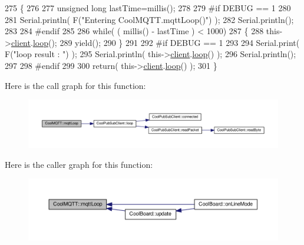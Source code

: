\begin{DoxyCode}
275 \{
276 
277     \textcolor{keywordtype}{unsigned} \textcolor{keywordtype}{long} lastTime=millis();
278 
279 \textcolor{preprocessor}{#if DEBUG == 1}
280 
281     Serial.println( F(\textcolor{stringliteral}{"Entering CoolMQTT.mqttLoop()"}) );
282     Serial.println();
283 
284 \textcolor{preprocessor}{#endif  }
285 
286     \textcolor{keywordflow}{while}( ( millis() - lastTime ) < 1000)
287     \{
288         this->\hyperlink{class_cool_m_q_t_t_afed1372683c44893b4668d0f1771f514}{client}.\hyperlink{class_cool_pub_sub_client_afc15900f0fc4886a19394508e61793b8}{loop}();
289         yield();
290     \}
291 
292 \textcolor{preprocessor}{#if DEBUG == 1 }
293     
294     Serial.print( F(\textcolor{stringliteral}{"loop result : "}) );
295     Serial.println( this->\hyperlink{class_cool_m_q_t_t_afed1372683c44893b4668d0f1771f514}{client}.\hyperlink{class_cool_pub_sub_client_afc15900f0fc4886a19394508e61793b8}{loop}() );
296     Serial.println();
297 
298 \textcolor{preprocessor}{#endif}
299 
300     \textcolor{keywordflow}{return}( this->\hyperlink{class_cool_m_q_t_t_afed1372683c44893b4668d0f1771f514}{client}.\hyperlink{class_cool_pub_sub_client_afc15900f0fc4886a19394508e61793b8}{loop}() );
301 \}
\end{DoxyCode}
Here is the call graph for this function\+:\nopagebreak
\begin{figure}[H]
\begin{center}
\leavevmode
\includegraphics[width=350pt]{d0/dd0/class_cool_m_q_t_t_aa5eaae967b562b62cbcf2b8d81f6e5d5_cgraph}
\end{center}
\end{figure}
Here is the caller graph for this function\+:\nopagebreak
\begin{figure}[H]
\begin{center}
\leavevmode
\includegraphics[width=350pt]{d0/dd0/class_cool_m_q_t_t_aa5eaae967b562b62cbcf2b8d81f6e5d5_icgraph}
\end{center}
\end{figure}
\mbox{\label{class_cool_m_q_t_t_a40553a0ad4b5ecf1cb4411ab54ca85fb}} 
